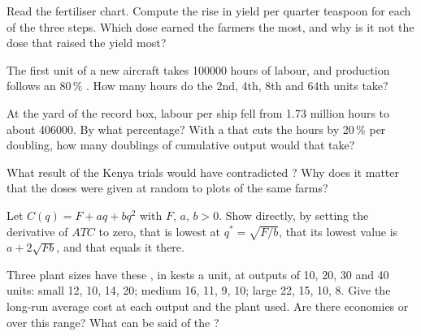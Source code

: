 \begin{exercise}[$\star\star$]\label{exo:g11:production-and-costs:9}
Read the fertiliser chart. Compute the rise in yield per quarter teaspoon for each of the three steps. Which dose earned the farmers the most, and why is it not the
dose that raised the yield most?
\end{exercise}

\begin{exercise}[$\star\star$]\label{exo:g11:production-and-costs:10}
The first unit of a new aircraft takes \num{100000} hours of labour, and production follows an 80\,\% . How many hours do the 2nd, 4th, 8th and 64th units
take?
\end{exercise}

\begin{exercise}[$\star\star$]\label{exo:g11:production-and-costs:11}
At the yard of the record box, labour per ship fell from 1.73 million hours to about \num{406000}. By what percentage? With a  that cuts the hours by 20\,\%
per doubling, how many doublings of cumulative output would that take?
\end{exercise}

\begin{exercise}[$\star\star\star$]\label{exo:g11:production-and-costs:12}
What result of the Kenya trials would have contradicted ? Why does it matter that the doses were given at random to plots of the same
farms?
\end{exercise}

\begin{exercise}[$\star\star\star$]\label{exo:g11:production-and-costs:13}
Let $C(q) = F + aq + bq^2$ with $F$, $a$, $b > 0$. Show directly, by setting the derivative of $\mathit{ATC}$ to zero, that  is lowest at $q^* = \sqrt{F/b}$,
that its lowest value is $a + 2\sqrt{Fb}$, and that  equals it there.
\end{exercise}

\begin{exercise}[$\star\star\star$]\label{exo:g11:production-and-costs:14}
Three plant sizes have these , in kests a unit, at outputs of 10, 20, 30 and 40 units: small 12, 10, 14, 20; medium 16, 11, 9, 10; large 22, 15, 10,
8. Give the long-run average cost at each output and the plant used. Are there economies or  over this range? What can be said of the ?
\end{exercise}

